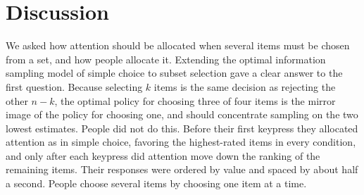 \documentclass[10pt,letterpaper]{article}
\begin{document}
\section*{Discussion}\label{discussion}

We asked how attention should be allocated when several items must be
chosen from a set, and how people allocate it. Extending the optimal
information sampling model of simple choice \cite{callaway2021} to
subset selection gave a clear answer to the first question. Because
selecting \(k\) items is the same decision as rejecting the other
\(n - k\), the optimal policy for choosing three of four items is the
mirror image of the policy for choosing one, and should concentrate
sampling on the two lowest estimates. People did not do this. Before
their first keypress they allocated attention as in simple choice,
favoring the highest-rated items in every condition, and only after each
keypress did attention move down the ranking of the remaining items.
Their responses were ordered by value and spaced by about half a second.
People choose several items by choosing one item at a time.
\end{document}
